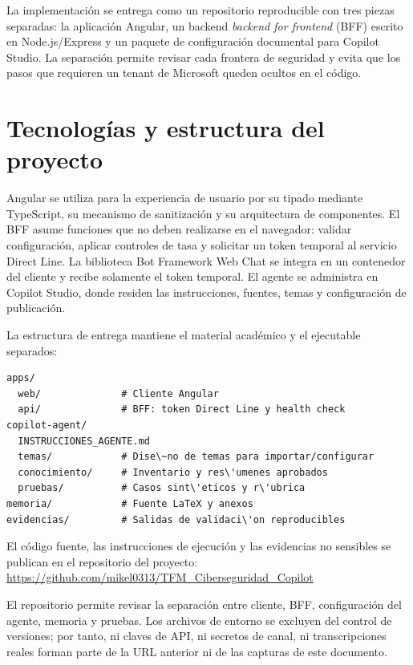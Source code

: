 \documentclass[12pt,twoside,titlepage]{book}
\begin{document}
La implementaci\'on se entrega como un repositorio reproducible con tres piezas separadas: la aplicaci\'on Angular, un backend \emph{backend for frontend} (BFF) escrito en Node.js/Express y un paquete de configuraci\'on documental para Copilot Studio. La separaci\'on permite revisar cada frontera de seguridad y evita que los pasos que requieren un tenant de Microsoft queden ocultos en el c\'odigo.

\section{Tecnolog\'ias y estructura del proyecto}

Angular se utiliza para la experiencia de usuario por su tipado mediante TypeScript, su mecanismo de sanitizaci\'on y su arquitectura de componentes. El BFF asume funciones que no deben realizarse en el navegador: validar configuraci\'on, aplicar controles de tasa y solicitar un token temporal al servicio Direct Line. La biblioteca Bot Framework Web Chat se integra en un contenedor del cliente y recibe solamente el token temporal. El agente se administra en Copilot Studio, donde residen las instrucciones, fuentes, temas y configuraci\'on de publicaci\'on.

La estructura de entrega mantiene el material acad\'emico y el ejecutable separados:

\begin{lstlisting}[caption={Estructura l\'ogica del repositorio.},label={lst:estructura}]
apps/
  web/              # Cliente Angular
  api/              # BFF: token Direct Line y health check
copilot-agent/
  INSTRUCCIONES_AGENTE.md
  temas/            # Dise\~no de temas para importar/configurar
  conocimiento/     # Inventario y res\'umenes aprobados
  pruebas/          # Casos sint\'eticos y r\'ubrica
memoria/            # Fuente LaTeX y anexos
evidencias/         # Salidas de validaci\'on reproducibles
\end{lstlisting}

El c\'odigo fuente, las instrucciones de ejecuci\'on y las evidencias no sensibles se publican en el repositorio del proyecto:\newline
\url{https://github.com/mikel0313/TFM_Ciberseguridad_Copilot}

El repositorio permite revisar la separaci\'on entre cliente, BFF, configuraci\'on del agente, memoria y pruebas. Los archivos de entorno se excluyen del control de versiones; por tanto, ni claves de API, ni secretos de canal, ni transcripciones reales forman parte de la URL anterior ni de las capturas de este documento.
\end{document}
